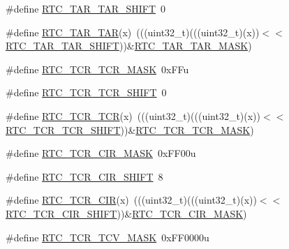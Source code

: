 \begin{DoxyCompactItemize}
\item 
\#define \hyperlink{group___r_t_c___register___masks_ga9ec8791d91dc36f0f59a7705988f7278}{R\+T\+C\+\_\+\+T\+A\+R\+\_\+\+T\+A\+R\+\_\+\+S\+H\+I\+FT}~0
\item 
\#define \hyperlink{group___r_t_c___register___masks_ga02ce5bc2603bebe1356ce961142f6700}{R\+T\+C\+\_\+\+T\+A\+R\+\_\+\+T\+AR}(x)~(((uint32\+\_\+t)(((uint32\+\_\+t)(x))$<$$<$\hyperlink{group___r_t_c___register___masks_ga9ec8791d91dc36f0f59a7705988f7278}{R\+T\+C\+\_\+\+T\+A\+R\+\_\+\+T\+A\+R\+\_\+\+S\+H\+I\+FT}))\&\hyperlink{group___r_t_c___register___masks_ga649a76416ad00079054bd866565dada2}{R\+T\+C\+\_\+\+T\+A\+R\+\_\+\+T\+A\+R\+\_\+\+M\+A\+SK})
\item 
\#define \hyperlink{group___r_t_c___register___masks_ga48a96d1de8db1993bfac3ca9d6bdb227}{R\+T\+C\+\_\+\+T\+C\+R\+\_\+\+T\+C\+R\+\_\+\+M\+A\+SK}~0x\+F\+Fu
\item 
\#define \hyperlink{group___r_t_c___register___masks_ga0d8bc8c79b8010b8ebb94562428713fe}{R\+T\+C\+\_\+\+T\+C\+R\+\_\+\+T\+C\+R\+\_\+\+S\+H\+I\+FT}~0
\item 
\#define \hyperlink{group___r_t_c___register___masks_gaca21d09697f88aef5b056c81daaa8445}{R\+T\+C\+\_\+\+T\+C\+R\+\_\+\+T\+CR}(x)~(((uint32\+\_\+t)(((uint32\+\_\+t)(x))$<$$<$\hyperlink{group___r_t_c___register___masks_ga0d8bc8c79b8010b8ebb94562428713fe}{R\+T\+C\+\_\+\+T\+C\+R\+\_\+\+T\+C\+R\+\_\+\+S\+H\+I\+FT}))\&\hyperlink{group___r_t_c___register___masks_ga48a96d1de8db1993bfac3ca9d6bdb227}{R\+T\+C\+\_\+\+T\+C\+R\+\_\+\+T\+C\+R\+\_\+\+M\+A\+SK})
\item 
\#define \hyperlink{group___r_t_c___register___masks_ga8f198d1dbc7427e1dfabdc4e9f53f8e2}{R\+T\+C\+\_\+\+T\+C\+R\+\_\+\+C\+I\+R\+\_\+\+M\+A\+SK}~0x\+F\+F00u
\item 
\#define \hyperlink{group___r_t_c___register___masks_ga4b8c9ecf8ed798b8c0173ce122874c5e}{R\+T\+C\+\_\+\+T\+C\+R\+\_\+\+C\+I\+R\+\_\+\+S\+H\+I\+FT}~8
\item 
\#define \hyperlink{group___r_t_c___register___masks_ga2425cc5a6f775938d0c0aa5448b96b05}{R\+T\+C\+\_\+\+T\+C\+R\+\_\+\+C\+IR}(x)~(((uint32\+\_\+t)(((uint32\+\_\+t)(x))$<$$<$\hyperlink{group___r_t_c___register___masks_ga4b8c9ecf8ed798b8c0173ce122874c5e}{R\+T\+C\+\_\+\+T\+C\+R\+\_\+\+C\+I\+R\+\_\+\+S\+H\+I\+FT}))\&\hyperlink{group___r_t_c___register___masks_ga8f198d1dbc7427e1dfabdc4e9f53f8e2}{R\+T\+C\+\_\+\+T\+C\+R\+\_\+\+C\+I\+R\+\_\+\+M\+A\+SK})
\item 
\#define \hyperlink{group___r_t_c___register___masks_ga920f92da02ac0a6ae0931645600e2405}{R\+T\+C\+\_\+\+T\+C\+R\+\_\+\+T\+C\+V\+\_\+\+M\+A\+SK}~0x\+F\+F0000u
$$
\end{DoxyCompactItemize}
